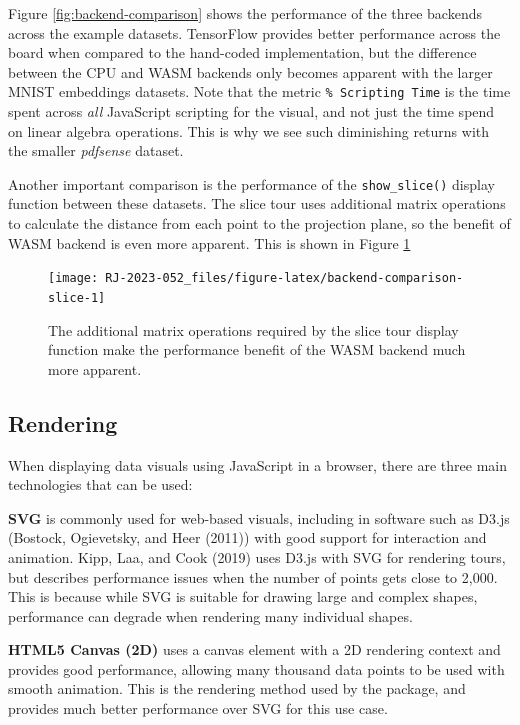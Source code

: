 Figure \ref{fig:backend-comparison} shows the performance of the three backends across the example datasets. TensorFlow provides better performance across the board when compared to the hand-coded implementation, but the difference between the CPU and WASM backends only becomes apparent with the larger MNIST embeddings datasets. Note that the metric \texttt{\%\ Scripting\ Time} is the time spent across \emph{all} JavaScript scripting for the visual, and not just the time spend on linear algebra operations. This is why we see such diminishing returns with the smaller \emph{pdfsense} dataset.

Another important comparison is the performance of the \texttt{show\_slice()} display function between these datasets. The slice tour uses additional matrix operations to calculate the distance from each point to the projection plane, so the benefit of WASM backend is even more apparent. This is shown in Figure \ref{fig:backend-comparison-slice}

\begin{figure}

{\centering \texttt{[image: RJ-2023-052\_files/figure-latex/backend-comparison-slice-1]} 

}

\caption{The additional matrix operations required by the slice tour display function make the performance benefit of the WASM backend much more apparent.}\label{fig:backend-comparison-slice}
\end{figure}

\hypertarget{rendering}{%
\subsection{Rendering}\label{rendering}}

When displaying data visuals using JavaScript in a browser, there are three main technologies that can be used:

\textbf{SVG} is commonly used for web-based visuals, including in software such as D3.js (Bostock, Ogievetsky, and Heer (2011)) with good support for interaction and animation. Kipp, Laa, and Cook (2019) uses D3.js with SVG for rendering tours, but describes performance issues when the number of points gets close to 2,000. This is because while SVG is suitable for drawing large and complex shapes, performance can degrade when rendering many individual shapes.

\textbf{HTML5 Canvas (2D)} uses a canvas element with a 2D rendering context and provides good performance, allowing many thousand data points to be used with smooth animation. This is the rendering method used by the  package, and provides much better performance over SVG for this use case.

